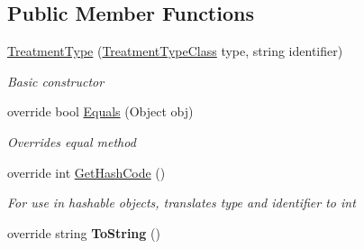 \subsection*{Public Member Functions}
\begin{DoxyCompactItemize}
\item 
\hyperlink{class_general_health_care_elements_1_1_treatment_admission_types_1_1_treatment_type_a4e17b1cc391d5b0ce948dbd35ed3dc9b}{Treatment\+Type} (\hyperlink{namespace_enums_a818a2209a7496285390744fe2e319e3d}{Treatment\+Type\+Class} type, string identifier)
\begin{DoxyCompactList}\small\item\em Basic constructor \end{DoxyCompactList}\item 
override bool \hyperlink{class_general_health_care_elements_1_1_treatment_admission_types_1_1_treatment_type_ad8c7e77a36e44886969cc1d22a7a6a4e}{Equals} (Object obj)
\begin{DoxyCompactList}\small\item\em Overrides equal method \end{DoxyCompactList}\item 
override int \hyperlink{class_general_health_care_elements_1_1_treatment_admission_types_1_1_treatment_type_a1cb14924bc4fc7e9956e71a7da598892}{Get\+Hash\+Code} ()
\begin{DoxyCompactList}\small\item\em For use in hashable objects, translates type and identifier to int \end{DoxyCompactList}\item 
override string {\bfseries To\+String} ()\hypertarget{class_general_health_care_elements_1_1_treatment_admission_types_1_1_treatment_type_af6a663b0cee101942bc328681f5094f7}{}\label{class_general_health_care_elements_1_1_treatment_admission_types_1_1_treatment_type_af6a663b0cee101942bc328681f5094f7}

\end{DoxyCompactItemize}
